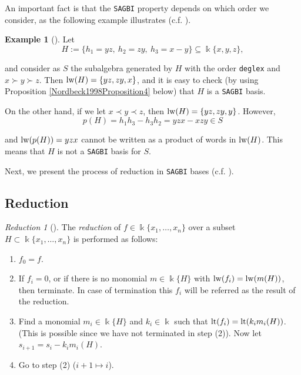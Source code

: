 \documentclass{amsart}
\theoremstyle{definition}
\newtheorem{example}[theorem]{Example}
\theoremstyle{remark}
\newtheorem{reduction}{Reduction}[section]
\numberwithin{equation}{section}
\begin{document}
An important fact is that the \texttt{SAGBI} property depends on which order we consider, as the following example illustrates (c.f. \cite[Example 6.6.7]{KreuzerRobbiano2005}).

\begin{example}[{\cite[Example 3]{Nordbeck1998}}]\label{Nordbeck1998Example3}
Let 
$$
H := \{h_1 = yz,\ h_2 = zy,\ h_3 = x-y\}\subseteq \Bbbk \{x, y, z\},
$$

and consider as $S$ the subalgebra generated by $H$ with the order \texttt{deglex} and $x \succ y \succ z$. Then ${\rm lw}(H) = \{yz, zy, x\}$, and it is easy to check (by using Proposition \ref{Nordbeck1998Proposition4} below) that $H$ is a \texttt{SAGBI} basis.

On the other hand, if we let $x\prec y \prec z$, then ${\rm lw}(H) = \{yz, zy, y\}$. However, 
$$
p(H) = h_1h_3 - h_3h_2 = yzx - xzy \in S
$$ 

and ${\rm lw}(p(H)) = yzx$ cannot be written as a product of words in ${\rm lw}(H)$. This means that $H$ is not a \texttt{SAGBI} basis for $S$.
\end{example}

Next, we present the process of reduction in \texttt{SAGBI} bases (c.f. \cite[Definition 6.6.16]{KreuzerRobbiano2005}).


\subsection{Reduction}

\begin{reduction}[{\cite[p. 141]{Nordbeck1998}}]\label{Nordbeck1998reduction}
The {\em reduction} of $f\in \Bbbk\{x_1, \dotsc, x_n\}$ over a subset $H\subset \Bbbk \{x_1, \dotsc, x_n\}$ is performed as follows:
\begin{enumerate}
    \item [\rm (1)] $f_0 = f$.
    \item [\rm (2)] If $f_i = 0$, or if there is no monomial $m \in \Bbbk \{H\}$ with ${\rm lw}(f_i) = {\rm lw}(m(H))$, then terminate. In case of termination this $f_i$ will be referred as the result of the reduction.
    \item [\rm (3)] Find a monomial $m_i \in \Bbbk \{H\}$ and $k_i \in \Bbbk$ such that ${\rm lt}(f_i) = {\rm lt}(k_i m_i(H))$. (This is possible since we have not terminated in step (2)). Now let $s_{i + 1} = s_i - k_im_i(H)$.
    \item [\rm (4)] Go to step (2) ($i + 1 \mapsto i$).
\end{enumerate}
\end{reduction}
\end{document}
